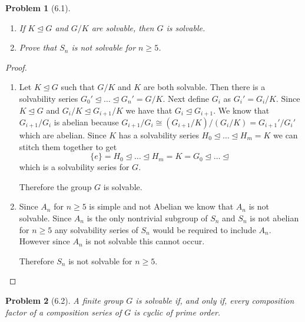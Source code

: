 \documentclass[10pt]{article}
\newcommand{\sk}{\vskip 10mm}
\theoremstyle{plain}
\newtheorem{problem}{Problem}
\theoremstyle{remark}
\begin{document}
\begin{problem}[6.1]
  \begin{enumerate}
  \item If $K\trianglelefteq G$ and $G/K$ are solvable, then $G$ is solvable.
  \item Prove that $S_n$ is not solvable for $n\geq 5$.
  \end{enumerate}
\end{problem}

\begin{proof}
  \begin{enumerate}
  \item Let $K\trianglelefteq G$ such that $G/K$ and $K$ are both solvable.
    Then there is a solvability series
    $G_0'\trianglelefteq\ldots\trianglelefteq G_n' =G/K$.
    Next define $G_i$ as $G_{i}'=G_i/K$. Since $K\trianglelefteq G$ and
    $G_i/K\trianglelefteq G_{i+1}/K$ we have that $G_i\trianglelefteq G_{i+1}$.
    We know that $G_{i+1}/G_i$ is abelian because
    $G_{i+1}/G_i\cong (G_{i+1}/K)/(G_i/K)=G_{i+1}'/G_i'$ which are abelian.
    Since $K$ has a solvability series
    $H_0\trianglelefteq \ldots\trianglelefteq H_m=K$ we can stitch
    them together to get
    \[ \{e\}=H_0\trianglelefteq\ldots\trianglelefteq H_m=K=G_0\trianglelefteq
      \ldots\trianglelefteq\]
    which is a solvability series for $G$.

    Therefore the group $G$ is solvable.
  \item Since $A_n$ for $n\geq 5$ is simple and not Abelian we know that
    $A_n$ is not solvable. Since $A_n$ is the only nontrivial subgroup of
    $S_n$ and $S_n$ is not abelian for $n\geq 5$ any solvability series of $S_n$
    would be required to include $A_n$. However since $A_n$ is not solvable
    this cannot occur.

    Therefore $S_n$ is not solvable for $n\geq 5$.
  \end{enumerate}
\end{proof}

\sk

\begin{problem}[6.2]
  A finite group $G$ is solvable if, and only if, every composition factor
  of a composition series of $G$ is cyclic of prime order.
\end{problem}
\end{document}
